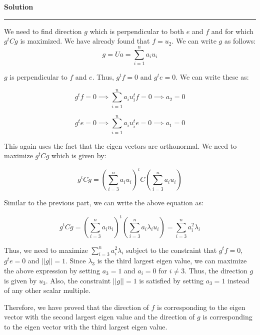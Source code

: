 \documentclass[a4paper,12pt]{article}
\newenvironment{solution}[2][]{%
    \begin{mdframed}[linecolor=blue!70!black, linewidth=2pt, roundcorner=10pt, backgroundcolor=yellow!10!white, skipabove=12pt, skipbelow=12pt]%
        \textbf{\large #2}
        \par\noindent\rule{\textwidth}{0.4pt}
}{
    \end{mdframed}
}
\begin{document}
\clearpage
\begin{solution}{Solution}
  We need to find direction $g$ which is perpendicular to both $e$ and $f$ and for which $g^tCg$ is maximized. We have already found that $f = u_2$. We can write $g$ as follows:
  \begin{equation}
    g = Ua = \sum_{i=1}^{n} a_iu_i
  \end{equation}

$g$ is perpendicular to $f$ and $e$. Thus, $g^tf = 0$ and $g^te = 0$. We can write these as:

\begin{equation}
  g^tf = 0 \implies \sum_{i=1}^{n} a_iu_i^tf = 0 \implies a_2 = 0
\end{equation}

\begin{equation}
  g^te = 0 \implies \sum_{i=1}^{n} a_iu_i^te = 0 \implies a_1 = 0
\end{equation}

This again uses the fact that the eigen vectors are orthonormal. We need to maximize $g^tCg$ which is given by:

\begin{equation}
  g^tCg = (\sum_{i=3}^n a_iu_i)^t C(\sum_{i=3}^n a_iu_i)
\end{equation}

Similar to the previous part, we can write the above equation as:

\begin{equation}
  g^tCg = (\sum_{i=3}^n a_iu_i)^t (\sum_{i=3}^n a_i\lambda_iu_i) = \sum_{i=3}^n a_i^2\lambda_i
\end{equation}

Thus, we need to maximize $\sum_{i=3}^n a_i^2\lambda_i$ subject to the constraint that $g^tf = 0$, $g^te = 0$ and $||g|| = 1$. Since $\lambda_3$ is the third largest eigen value, we can maximize the above expression by setting $a_3 = 1$ and $a_i = 0$ for $i \neq 3$. Thus, the direction $g$ is given by $u_3$. Also, the constraint $||g|| = 1$ is satisfied by setting $a_3 = 1$ instead of any other scalar multiple.


Therefore, we have proved that the direction of $f$ is corresponding to the eigen vector with the second largest eigen value and the direction of $g$ is corresponding to the eigen vector with the third largest eigen value.
\end{solution}
\end{document}
